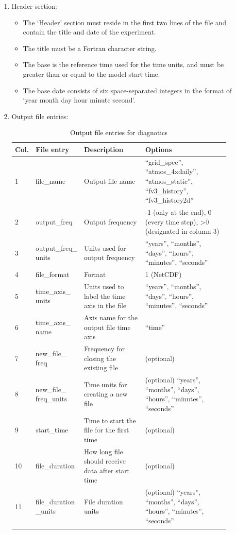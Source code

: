 \documentclass[11pt,fleqn]{report}              %
\begin{document}
\begin{enumerate}
\item Header section:
\begin{itemize}
\item The `Header' section must reside in the first two lines of the file and contain the title and date of the experiment. 
\item The title must be a Fortran character string.
\item The base is the reference time used for the time units, and must be greater than or equal to the model start time.
\item The base date consists of six space-separated integers in the format of `year month day hour minute second'.
\end{itemize}

\item Output file entries:
{
\fontsize{9}{11}\selectfont
\begin{longtable}{p{0.03\linewidth} | p{0.12\linewidth} | p{0.32\linewidth} | p{0.45\linewidth} }
\hline
\hline
Col. & File entry &Description & Options \\
\hline
1 & file\_name & Output file name & ``grid\_spec'', ``atmos\_4xdaily'', ``atmos\_static'', ``fv3\_history'', ``fv3\_history2d'' \\ 
2 & output\_freq & Output frequency &  -1 (only at the end), 0 (every time step), >0 (designated in column 3)  \\
3 & output\_freq\_ units & Units used for output frequency & ``years'', ``months'', ``days'', ``hours'', ``minutes'', ``seconds'' \\
4 & file\_format & Format & 1 (NetCDF) \\
5 & time\_axis\_ units & Units used to label the time axis in the file & ``years'', ``months'', ``days'', ``hours'', ``minutes'', ``seconds'' \\
6 & time\_axis\_ name & Axis name for the output file time axis & ``time'' \\
7 & new\_file\_ freq & Frequency for closing the existing file  & (optional) \\
8 & new\_file\_ freq\_units & Time units for creating a new file  & (optional) ``years'', ``months'', ``days'', ``hours'', ``minutes'', ``seconds''  \\
9 & start\_time & Time to start the file for the first time  & (optional) \\
10 & file\_duration & How long file should receive data after start time  & (optional) \\
11 & file\_duration \_units & File duration units & (optional)  ``years'', ``months'', ``days'', ``hours'', ``minutes'', ``seconds'' \\
\hline
\caption{Output file entries for diagnotics}
\label{table:fv3_diag_ouput_file}
\end{longtable}
}


\end{enumerate}
\end{document}
